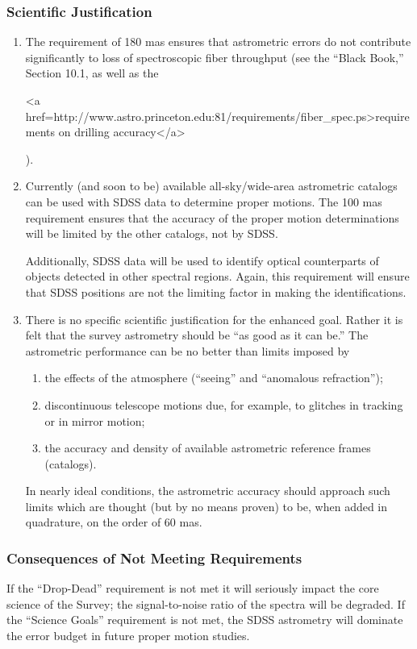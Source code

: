 \subsubsection{Scientific Justification}
\begin{enumerate}
\item The requirement of 180 mas ensures that astrometric errors do not
contribute significantly to loss of spectroscopic fiber throughput (see
the ``Black Book,'' Section 10.1, as well as the
\begin{rawhtml}
<a href=http://www.astro.princeton.edu:81/requirements/fiber_spec.ps>requirements on drilling
accuracy</a>\end{rawhtml}).
\item Currently (and soon to be) available all-sky/wide-area astrometric
catalogs can be used with SDSS data to determine proper motions.  The
100 mas
requirement ensures that the accuracy of the proper motion determinations
will be limited by the other catalogs, not by SDSS.

Additionally, SDSS data will be used to identify optical counterparts of
objects detected in other spectral regions. Again, this requirement
will ensure that SDSS positions are not the limiting factor in making
the identifications.
\item There is no specific scientific justification for the enhanced goal.
Rather it is felt that the survey astrometry should be ``as good as it
can be.''  The astrometric performance can be no better than limits imposed by
\begin{enumerate}
\item the effects of the atmosphere (``seeing'' and ``anomalous refraction'');
\item discontinuous telescope motions due, for example, to glitches in 
tracking or in mirror motion;
\item the accuracy and density of available astrometric reference frames
(catalogs).
\end{enumerate}
In nearly ideal conditions, the astrometric accuracy should approach such
limits which are thought (but by no means proven) to be, when added in
quadrature, on the order of 60 mas.
\end{enumerate}
\subsubsection{Consequences of Not Meeting Requirements}
If the ``Drop-Dead'' requirement is not met it will seriously impact
the core science of the Survey; the signal-to-noise ratio of the
spectra will be degraded. If the ``Science Goals'' requirement is not
met, the SDSS astrometry will dominate the error budget in future proper
motion studies. 

